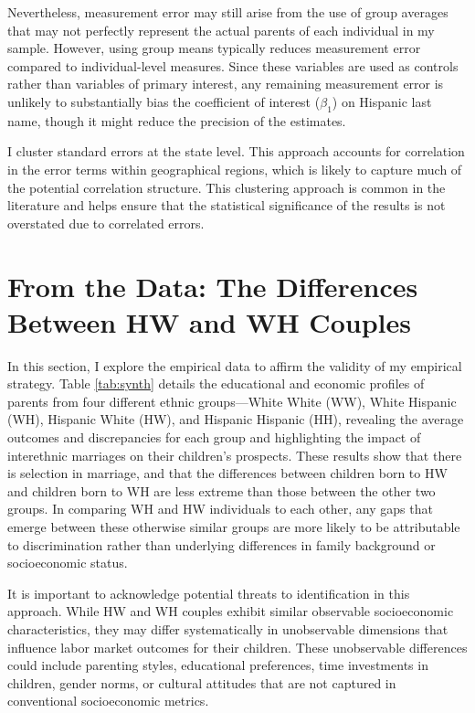 Nevertheless, measurement error may still arise from the use of group averages that may not perfectly represent the actual parents of each individual in my sample. However, using group means typically reduces measurement error compared to individual-level measures. Since these variables are used as controls rather than variables of primary interest, any remaining measurement error is unlikely to substantially bias the coefficient of interest ($\beta_1$) on Hispanic last name, though it might reduce the precision of the estimates.

I cluster standard errors at the state level. This approach accounts for correlation in the error terms within geographical regions, which is likely to capture much of the potential correlation structure. This clustering approach is common in the literature and helps ensure that the statistical significance of the results is not overstated due to correlated errors.

\section{From the Data: The Differences Between HW and WH Couples}\label{sec:hw-wh-couples-data}

In this section, I explore the empirical data to affirm the validity of my empirical strategy. Table \ref{tab:synth} details the educational and economic profiles of parents from four different ethnic groups—White White (WW), White Hispanic (WH), Hispanic White (HW), and Hispanic Hispanic (HH), revealing the average outcomes and discrepancies for each group and highlighting the impact of interethnic marriages on their children’s prospects. These results show that there is selection in marriage, and that the differences between children born to HW and children born to WH are less extreme than those between the other two groups. In comparing WH and HW individuals to each other, any gaps that emerge between these otherwise similar groups are more likely to be attributable to discrimination rather than underlying differences in family background or socioeconomic status.

It is important to acknowledge potential threats to identification in this approach. While HW and WH couples exhibit similar observable socioeconomic characteristics, they may differ systematically in unobservable dimensions that influence labor market outcomes for their children. These unobservable differences could include parenting styles, educational preferences, time investments in children, gender norms, or cultural attitudes that are not captured in conventional socioeconomic metrics.


